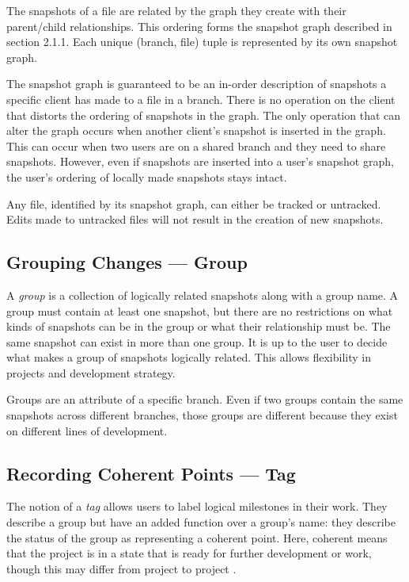 The snapshots of a file are related by the graph they create with their parent/child relationships. This ordering forms the snapshot graph described in section 2.1.1. Each unique (branch, file) tuple is represented by its own snapshot graph.

The snapshot graph is guaranteed to be an in-order description of snapshots a specific client has made to a file in a branch. There is no operation on the client that distorts the ordering of snapshots in the graph. The only operation that can alter the graph occurs when another client's snapshot is inserted in the graph. This can occur when two users are on a shared branch and they need to share snapshots. However, even if snapshots are inserted into a user's snapshot graph, the user's ordering of locally made snapshots stays intact.

Any file, identified by its snapshot graph, can either be tracked or untracked. Edits made to untracked files will not result in the creation of new snapshots.

\subsection{Grouping Changes --- Group}

A \textit{group} is a collection of logically related snapshots along with a group name. A group must contain at least one snapshot, but there are no restrictions on what kinds of snapshots can be in the group or what their relationship must be. The same snapshot can exist in more than one group. It is up to the user to decide what makes a group of snapshots logically related. This allows flexibility in projects and development strategy.

Groups are an attribute of a specific branch. Even if two groups contain the same snapshots across different branches, those groups are different because they exist on different lines of development.

\subsection{Recording Coherent Points --- Tag}

The notion of a \textit{tag} allows users to label logical milestones in their work. They describe a group but have an added function over a group's name: they describe the status of the group as representing a coherent point. Here, coherent means that the project is in a state that is ready for further development or work, though this may differ from project to project \cite{RossoJackson}. 

